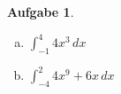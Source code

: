 \documentclass[12pt]{article}
\theoremstyle{note}
\newtheorem{aufgabe}{Aufgabe}
\begin{document}
 
\begin{flushleft}
\begin{aufgabe} ~ \\ 
\begin{multicols}{2} 
\begin{enumerate}[a)] 
\item 
$\int_{-1}^{4} 4 x^{3}\, dx$
\item 
$\int_{-4}^{2} 4 x^{9} + 6 x\, dx$
\end{enumerate} 
\end{multicols} 
\end{aufgabe} 
\end{flushleft} 
\end{document}
